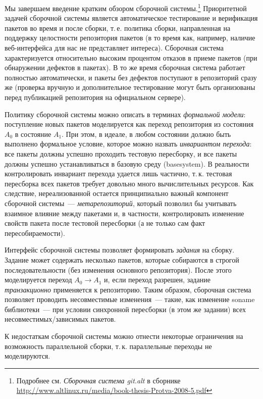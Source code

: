 \documentclass[russian,a4paper,12pt,titlepage]{article}
\begin{document}
Мы завершаем введение кратким обзором сборочной системы.\footnote{Подробнее см. \textit{Сборочная система git.alt}
в сборнике \url{http://www.altlinux.ru/media/book-thesis-Protva-2008-5.pdf}}  Приоритетной задачей сборочной системы
является автоматическое тестирование и верификация пакетов во время и после сборки, т.\,е. политика сборки, направленная
на поддержку целостности репозитория пакетов (в то время как, например, наличие веб-интерфейса для нас не представляет интереса).
Сборочная система характеризуется относительно высоким процентом отказов в приеме пакетов (при обнаружении дефектов в пакетах).
В то же время сборочная система работает полностью автоматически, и пакеты без дефектов поступают в репозиторий сразу же (проверка
вручную и дополнительное тестирование могут быть организованы перед публикацией репозитория на официальном сервере).

Политику сборочной системы можно описать в терминах \textit{формальной модели}: поступление новых пакетов моделируется
как переход репозитория из состояния $A_0$ в состояние $A_1$.  При этом, в идеале, в любом состоянии должно быть выполнено
формальное условие, которое можно назвать \textit{инвариантом перехода}: все пакеты должны успешно проходить тестовую пересборку,
и все пакеты должны успешно устанавливаться в базовую среду (basesystem).  В реальности контролировать инвариант перехода
удается лишь частично, т.\,к. тестовая пересборка всех пакетов требует довольно много вычислительных ресурсов.
Как следствие, нереализованной остается принципиально важный компонент сборочной системы~--- \textit{метарепозиторий},
который позволил бы учитывать взаимное влияние между пакетами и, в частности, контролировать изменение свойств пакета
после тестовой пересборки (а не только сам факт пересобираемости).

Интерфейс сборочной системы позволяет формировать \textit{задания} на сборку.  Задание может содержать несколько
пакетов, которые собираются в строгой последовательности (без изменения основного репозитория).  После этого моделируется
переход $A_0\to A_1$ и, если переход разрешен, задание \textit{транзакционно} применяется к репозиторию.  Таким образом,
сборочная система позволяет проводить несовместимые изменения~--- такие, как изменение soname библиотеки~--- при условии
синхронной пересборки (в этом же задании) всех несовместимых/зависимых пакетов.

К недостаткам сборочной системы можно отнести некоторые ограничения на возможность параллельной сборки,
т.\,к. параллельные переходы не моделируются.
\end{document}
